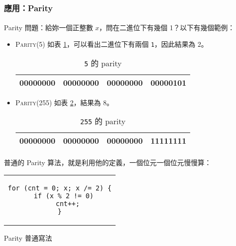\documentclass[12pt,a4paper,oneside]{article}
\begin{document}
\begin{CJK}{UTF8}{bkai}
\subsubsection{應用：Parity}

\paragraph{}Parity 問題：給妳一個正整數 $x$，問在二進位下有幾個 1？以下有幾個範例：

\begin{itemize}
\item \textsc{Parity(5)} 如表 \ref{basic:cpp:table:parity:5}，可以看出二進位下有兩個 \lstinline!1!，因此結果為 $2$。
\begin{table}[h!]
\centering
\begin{tabular}{|c|c|c|c|}
\hline
00000000 & 00000000 & 00000000 & 00000{\color{red}1}0{\color{red}1}\\
\hline
\end{tabular}
\caption{\lstinline!5! 的 parity}
\label{basic:cpp:table:parity:5}
\end{table}

\item \textsc{Parity(255)} 如表 \ref{basic:cpp:table:parity:255}，結果為 $8$。
\begin{table}[h!]
\centering
\begin{tabular}{|c|c|c|c|}
\hline
00000000 & 00000000 & 00000000 & {\color{red}11111111}\\
\hline
\end{tabular}
\caption{\lstinline!255! 的 parity}
\label{basic:cpp:table:parity:255}
\end{table}

\end{itemize}

\paragraph{}普通的 Parity 算法，就是利用他的定義，一個位元一個位元慢慢算：

\begin{code}[h!]
\centering
\begin{tabular}{c}
\begin{lstlisting}
for (cnt = 0; x; x /= 2) {
  if (x % 2 != 0)
    cnt++;
}
\end{lstlisting}
\end{tabular}
\caption{Parity 普通寫法}
\label{basic:cpp:code:parity:naive}
\end{code}


\end{CJK}
\end{document}
